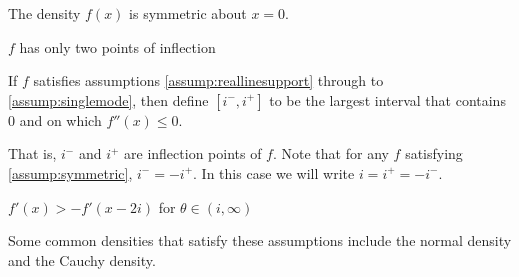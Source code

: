		\begin{assumption}[Symmetry]
			The density $f(x)$ is symmetric about $x = 0$.
			\label{assump:symmetric}
		\end{assumption}
		
		\begin{assumption}
			$f$ has only two points of inflection
			\label{assump:twoinflectionpoints}
		\end{assumption}
		
		\begin{definition}
			If $f$ satisfies assumptions \ref{assump:reallinesupport} through to \ref{assump:singlemode}, then define $[i^-,i^+]$ to be the largest interval that contains 0 and on which $f''(x) \leq 0$.
			\label{def:i-i+}
		\end{definition}
		That is, $i^-$ and $i^+$ are inflection points of $f$. Note that for any $f$ satisfying \ref{assump:symmetric}, $i^- = -i^+$. In this case we will write $i = i^+ = -i^-$.
		
		\begin{assumption}
			$f'(x) > -f'(x - 2i)$ for $\theta \in (i,\infty)$
			\label{assump:magnitudegradients}
		\end{assumption}
		
		Some common densities that satisfy these assumptions include the normal density and the Cauchy density.
		
